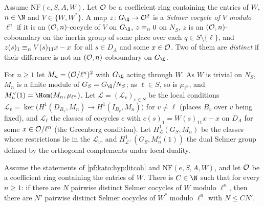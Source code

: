 \begin{definition}\label{pf:kato:def:seln}
Assume $\mathrm{NF}(e,S,A,W)$. Let $\mathcal{O}$ be a coefficient ring containing the entries of $W$, $n\in\N$ and $V\in\{W,W^*\}$. A map
$z\colon G_\Q\to\katoO^2$ is a \emph{Selmer cocycle of $V$ modulo $\ell^n$} if it is an $(\mathcal{O},n)$-cocycle of $V$ on $G_\Q$,
$z\equiv_{n}0$ on $N_S$, $z$ is an $(\mathcal{O},n)$-coboundary on the inertia group of some place over each $q\in S\setminus\{\ell\}$, and
$z(s)_1\equiv_{n}V(s)_{11}x-x$ for all $s\in D_A$ and some $x\in\mathcal{O}$. Two of them are \emph{distinct} if their difference is not an
$(\mathcal{O},n)$-coboundary on $G_\Q$.
\end{definition}

For $n\ge1$ let $M_n=(\mathcal{O}/\ell^n)^2$ with $G_\Q$ acting through $W$. As $W$ is trivial on $N_S$, $M_n$ is a finite module of
$G_S=G_\Q/N_S$; as $\ell\in S$, so is $\mu_{\ell^n}$, and $M_n^\vee(1)=\Hom(M_n,\mu_{\ell^n})$. Let $\mathcal L=(\mathcal L_v)_{v\in S}$ be the
local conditions $\mathcal L_v=\ker\bigl(H^1(D_{B_v},M_n)\to H^1(I_{B_v},M_n)\bigr)$ for $v\ne\ell$ (places $B_v$ over $v$ being fixed), and
$\mathcal L_\ell$ the classes of cocycles $c$ with $c(s)_1=W(s)_{11}x-x$ on $D_A$ for some $x\in\mathcal{O}/\ell^n$ (the Greenberg condition).
Let $H^1_{\mathcal L}(G_S,M_n)$ be the classes whose restrictions lie in the $\mathcal L_v$, and $H^1_{\mathcal L^\perp}(G_S,M_n^\vee(1))$ the
dual Selmer group defined by the orthogonal complements under local duality.

\begin{theorem}\label{pf:kato:gwineq}
Assume the statements of \cref{pf:kato:hyp:litcoh} and $\mathrm{NF}(e,S,A,W)$, and let $\mathcal{O}$ be a coefficient ring containing the
entries of $W$. There is $C\in\N$ such that for every $n\ge1$: if there are $N$ pairwise distinct Selmer cocycles of $W$ modulo $\ell^n$,
then there are $N'$ pairwise distinct Selmer cocycles of $W^*$ modulo $\ell^n$ with $N\le CN'$.
\end{theorem}

